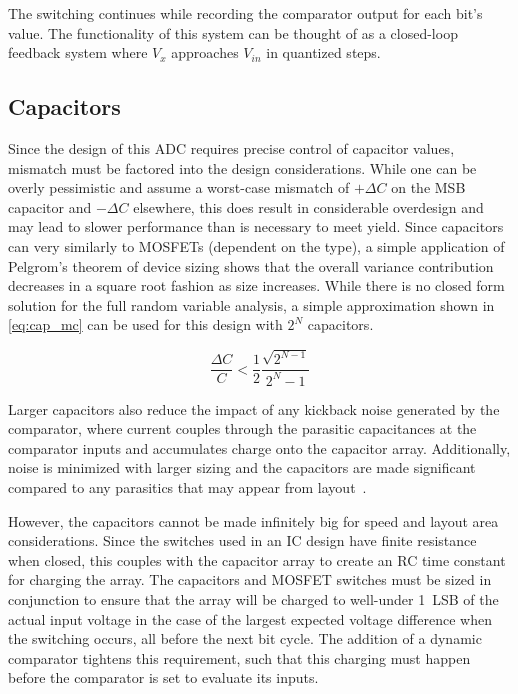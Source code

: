 \documentclass[11pt,letterpaper]{article}
\begin{document}
The switching continues while recording the comparator output for each bit's value. The functionality of this system can be thought of as a closed-loop feedback system where \(V_x\) approaches \(V_{in}\) in quantized steps.

\subsection{Capacitors}

Since the design of this ADC requires precise control of capacitor values, mismatch must be factored into the design considerations. While one can be overly pessimistic and assume a worst-case mismatch of \(+\Delta C\) on the MSB capacitor and \(-\Delta C\) elsewhere, this does result in considerable overdesign and may lead to slower performance than is necessary to meet yield. Since capacitors can very similarly to MOSFETs (dependent on the type), a simple application of Pelgrom's theorem of device sizing shows that the overall variance contribution decreases in a square root fashion as size increases. While there is no closed form solution for the full random variable analysis, a simple approximation shown in \cref{eq:cap_mc} can be used for this design with \(2^N\) capacitors.

\begin{equation}
    \frac{\Delta C}{C} < \frac{1}{2}\frac{\sqrt{2^{N-1}}}{2^N-1} \label{eq:cap_mc}
\end{equation}

Larger capacitors also reduce the impact of any kickback noise generated by the comparator, where current couples through the parasitic capacitances at the comparator inputs and accumulates charge onto the capacitor array. Additionally,  noise is minimized with larger sizing and the capacitors are made significant compared to any parasitics that may appear from layout~\cite{Alvarez-Fontecilla2019,Brenna2015}.

However, the capacitors cannot be made infinitely big for speed and layout area considerations. Since the switches used in an IC design have finite resistance when closed, this couples with the capacitor array to create an RC time constant for charging the array. The capacitors and MOSFET switches must be sized in conjunction to ensure that the array will be charged to well-under \qty{1}{LSB} of the actual input voltage in the case of the largest expected voltage difference when the switching occurs, all before the next bit cycle. The addition of a dynamic comparator tightens this requirement, such that this charging must happen before the comparator is set to evaluate its inputs. 
\end{document}
